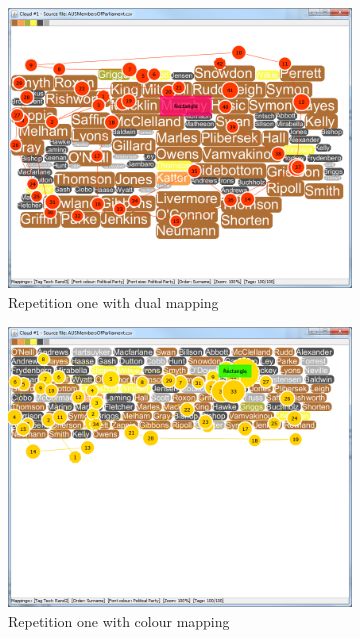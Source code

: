 \begin{figure}[!htb]
\centering
\begin{subfigure}{.5\textwidth}
  \centering
  \includegraphics[scale=0.25]{t1chaoticsearch1.png}
  \caption{Repetition one with dual mapping}
\end{subfigure}%
\begin{subfigure}{.5\textwidth}
  \centering
  \includegraphics[scale=0.25]{t1chaoticsearch2.png}
  \caption{Repetition one with colour mapping}
\end{subfigure}
\begin{subfigure}{.5\textwidth}

\end{subfigure}
\end{figure}
